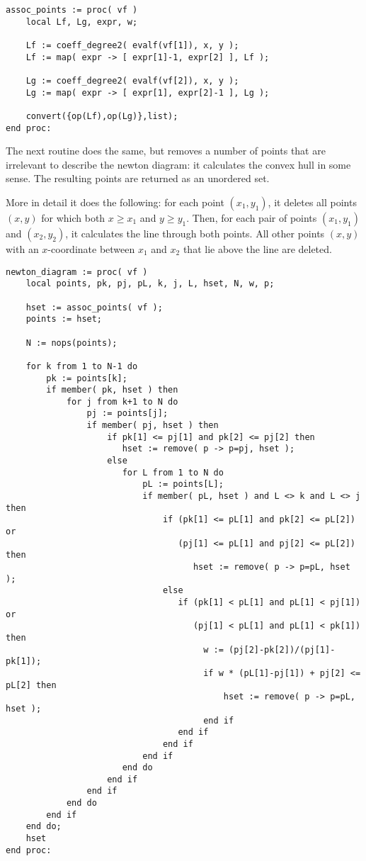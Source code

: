 \documentclass[a4paper,10pt]{article}
\begin{document}
\begin{lstlisting}[name=blowup]
assoc_points := proc( vf )
    local Lf, Lg, expr, w;

    Lf := coeff_degree2( evalf(vf[1]), x, y );
    Lf := map( expr -> [ expr[1]-1, expr[2] ], Lf );

    Lg := coeff_degree2( evalf(vf[2]), x, y );
    Lg := map( expr -> [ expr[1], expr[2]-1 ], Lg );

    convert({op(Lf),op(Lg)},list);
end proc:
\end{lstlisting}

The next routine does the same, but removes a number of points that are irrelevant to describe the
newton diagram: it calculates the convex hull in some sense.  The resulting points are returned
as an unordered set.
\medskip

\noindent More in detail it does the following:  for each point $(x_1,y_1)$, it deletes all points $(x,y)$
for which both $x\geq x_1$ and $y\geq y_1$.  Then, for each pair of points $(x_1,y_1)$ and
$(x_2,y_2)$, it calculates the line through both points.  All other points $(x,y)$ with an $x$-coordinate
between $x_1$ and $x_2$ that lie above the line are deleted.

\begin{lstlisting}[name=blowup]
newton_diagram := proc( vf )
    local points, pk, pj, pL, k, j, L, hset, N, w, p;

    hset := assoc_points( vf );
    points := hset;

    N := nops(points);

    for k from 1 to N-1 do
        pk := points[k];
        if member( pk, hset ) then
            for j from k+1 to N do
                pj := points[j];
                if member( pj, hset ) then
                    if pk[1] <= pj[1] and pk[2] <= pj[2] then
                       hset := remove( p -> p=pj, hset );
                    else
                       for L from 1 to N do
                           pL := points[L];
                           if member( pL, hset ) and L <> k and L <> j then
                               if (pk[1] <= pL[1] and pk[2] <= pL[2]) or
                                  (pj[1] <= pL[1] and pj[2] <= pL[2]) then
                                     hset := remove( p -> p=pL, hset );
                               else
                                  if (pk[1] < pL[1] and pL[1] < pj[1]) or
                                     (pj[1] < pL[1] and pL[1] < pk[1]) then
                                       w := (pj[2]-pk[2])/(pj[1]-pk[1]);
                                       if w * (pL[1]-pj[1]) + pj[2] <= pL[2] then
                                           hset := remove( p -> p=pL, hset );
                                       end if
                                  end if
                               end if
                           end if
                       end do
                    end if
                end if
            end do
        end if
    end do;
    hset
end proc:
\end{lstlisting}
\end{document}
